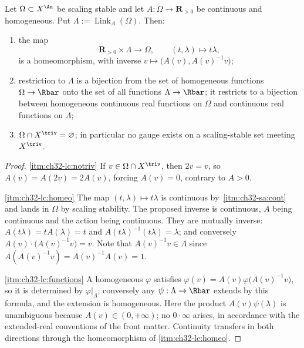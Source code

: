 \begin{theorem}
\label{thm:ch32-link-cone}
Let $\Omega\subset X^{\An}$ be scaling stable and let
$A:\Omega\to\mathbf R_{>0}$ be continuous and homogeneous.  Put
$\Lambda:=\operatorname{Link}_A(\Omega)$.  Then:
\begin{enumerate}
\item\label{itm:ch32-lc:homeo}
the map
\[
 \mathbf R_{>0}\times\Lambda\longrightarrow\Omega,
 \qquad (t,\lambda)\longmapsto t\lambda,
\]
is a homeomorphism, with inverse
$v\mapsto\bigl(A(v),A(v)^{-1}v\bigr)$;
\item\label{itm:ch32-lc:functions}
restriction to $\Lambda$ is a bijection from the set of homogeneous
functions $\Omega\to\Rbar$ onto the set of all functions
$\Lambda\to\Rbar$; it restricts to a bijection between homogeneous
continuous real functions on $\Omega$ and continuous real functions on
$\Lambda$;
\item\label{itm:ch32-lc:notriv}
$\Omega\cap X^{\triv}=\varnothing$; in particular no gauge exists on a
scaling-stable set meeting $X^{\triv}$.
\end{enumerate}
\end{theorem}

\begin{proof}
\cref{itm:ch32-lc:notriv}  If $v\in\Omega\cap X^{\triv}$, then $2v=v$, so
$A(v)=A(2v)=2A(v)$, forcing $A(v)=0$, contrary to
$A>0$.

\cref{itm:ch32-lc:homeo}  The map $(t,\lambda)\mapsto t\lambda$ is
continuous by \,\cref{itm:ch32-sa:cont} and
lands in $\Omega$ by scaling stability.  The proposed inverse is
continuous, $A$ being continuous and the action being continuous.  They are
mutually inverse: $A(t\lambda)=tA(\lambda)=t$ and
$A(t\lambda)^{-1}(t\lambda)=\lambda$; and conversely
$A(v)\cdot\bigl(A(v)^{-1}v\bigr)=v$.  Note that
$A(v)^{-1}v\in\Lambda$ since $A(A(v)^{-1}v)=A(v)^{-1}A(v)=1$.

\cref{itm:ch32-lc:functions}  A homogeneous $\varphi$ satisfies
$\varphi(v)=A(v)\varphi\bigl(A(v)^{-1}v\bigr)$, so it is determined by
$\varphi|_\Lambda$; conversely any $\psi:\Lambda\to\Rbar$ extends by this
formula, and the extension is homogeneous.  Here the product
$A(v)\psi(\lambda)$ is unambiguous because $A(v)\in(0,+\infty)$; no
$0\cdot\infty$ arises, in accordance with the extended-real conventions of
the front matter.  Continuity transfers in both directions through the
homeomorphism of \cref{itm:ch32-lc:homeo}.
\end{proof}

